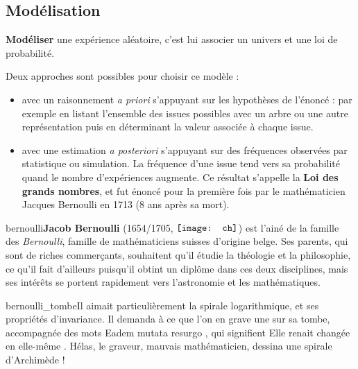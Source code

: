 \documentclass[a4paper,11pt]{article}
\begin{document}
\subsection{Modélisation}

\begin{cmethode}
\textbf{Modéliser} une expérience aléatoire, c’est lui associer un univers et une loi de probabilité.

Deux approches sont possibles pour \og choisir \fg{} ce modèle :
\begin{itemize}
	\item avec un raisonnement \textit{a priori} s’appuyant sur les hypothèses de l’énoncé : par exemple en listant l’ensemble des issues possibles avec un arbre ou une autre représentation puis en déterminant la valeur associée à chaque issue.
	\item avec une estimation \textit{a posteriori} s’appuyant sur des fréquences observées par statistique ou simulation. La fréquence d’une issue tend vers sa probabilité quand le nombre d’expériences augmente. Ce résultat s’appelle la \textbf{Loi des grands nombres}, et fut énoncé pour la première fois par le mathématicien Jacques Bernoulli en 1713 (8 ans après sa mort).
\end{itemize}
\end{cmethode}

\begin{chistoire}
\vspace{-0.22cm}
\lettrine[findent=.5em,nindent=0pt,lines=3,image,novskip=0pt]{bernoulli}{}\textbf{Jacob Bernoulli} (1654/1705, $\vcenter{\hbox{\texttt{[image: ch]}}}$) est l'ainé de la famille des \textit{Bernoulli}, famille de mathématiciens suisses d'origine belge. Ses parents, qui sont de riches commerçants, souhaitent qu'il étudie la théologie et la philosophie, ce qu'il fait d'ailleurs puisqu'il obtint un diplôme dans ces deux disciplines, mais ses intérêts se portent rapidement vers l'astronomie et les mathématiques.

\lettrine[findent=.5em,nindent=0pt,lines=4,image,novskip=0pt]{bernoulli_tombe}{}Il aimait particulièrement la spirale logarithmique, et ses propriétés d'invariance. Il demanda à ce que l'on en grave une sur sa tombe, accompagnée des mots \og Eadem mutata resurgo \fg, qui signifient \og Elle renait changée en elle-même \fg. Hélas, le graveur, mauvais mathématicien, dessina une spirale d'Archimède !
\end{chistoire}
\end{document}
